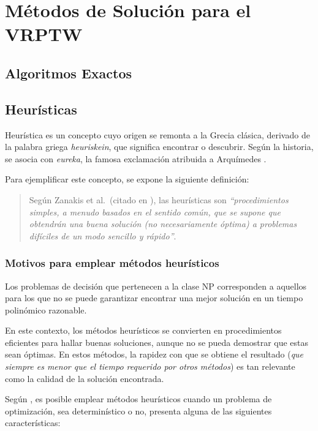 \documentclass[12pt,titlepage,twoside,openright]{book}
\begin{document}
\section{Métodos de Solución para el VRPTW}
\subsection{Algoritmos Exactos}

\subsection{Heurísticas}

Heurística es un concepto cuyo origen se remonta a la Grecia clásica, derivado de la palabra griega \textit{heuriskein}, que significa encontrar o descubrir. Según la historia, se asocia con \textit{eureka}, la famosa exclamación atribuida a Arquímedes \citep{antonioSuarez2014}.

Para ejemplificar este concepto, se expone la siguiente definición:

\begin{quote}
	Según Zanakis et al.\ (citado en \citep{duarte2007metaheuristicas}), las heurísticas son \textit{``procedimientos simples, a menudo basados en el sentido común, que se supone que obtendrán una buena solución (no necesariamente óptima) a problemas difíciles de un modo sencillo y rápido''}.
\end{quote}

\subsubsection{Motivos para emplear métodos heurísticos}

Los problemas de decisión que pertenecen a la clase NP corresponden a aquellos para los que no se puede garantizar encontrar una mejor solución en un tiempo polinómico razonable.

En este contexto, los métodos heurísticos se convierten en procedimientos eficientes para hallar buenas soluciones, aunque no se pueda demostrar que estas sean óptimas. En estos métodos, la rapidez con que se obtiene el resultado (\textit{que siempre es menor que el tiempo requerido por otros métodos}) es tan relevante como la calidad de la solución encontrada.

Según \citep{antonioSuarez2014}, es posible emplear métodos heurísticos cuando un problema de optimización, sea determinístico o no, presenta alguna de las siguientes características:
\end{document}
